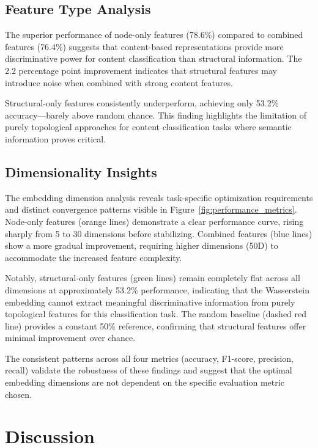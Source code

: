 \documentclass[linenumbers]{aastex701}
\begin{document}
\subsection{Feature Type Analysis}
The superior performance of node-only features (78.6\%) compared to combined features (76.4\%) suggests that content-based representations provide more discriminative power for content classification than structural information. The 2.2 percentage point improvement indicates that structural features may introduce noise when combined with strong content features.

Structural-only features consistently underperform, achieving only 53.2\% accuracy—barely above random chance. This finding highlights the limitation of purely topological approaches for content classification tasks where semantic information proves critical.

\subsection{Dimensionality Insights}
The embedding dimension analysis reveals task-specific optimization requirements and distinct convergence patterns visible in Figure~\ref{fig:performance_metrics}. Node-only features (orange lines) demonstrate a clear performance curve, rising sharply from 5 to 30 dimensions before stabilizing. Combined features (blue lines) show a more gradual improvement, requiring higher dimensions (50D) to accommodate the increased feature complexity. 

Notably, structural-only features (green lines) remain completely flat across all dimensions at approximately 53.2\% performance, indicating that the Wasserstein embedding cannot extract meaningful discriminative information from purely topological features for this classification task. The random baseline (dashed red line) provides a constant 50\% reference, confirming that structural features offer minimal improvement over chance.

The consistent patterns across all four metrics (accuracy, F1-score, precision, recall) validate the robustness of these findings and suggest that the optimal embedding dimensions are not dependent on the specific evaluation metric chosen.

\section{Discussion} \label{sec:discussion}
\end{document}
